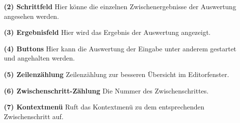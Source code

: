 \documentclass[parskip=full,11pt,twoside]{scrartcl}
\begin{document}
\textbf{(2) Schrittfeld}
\newline Hier könne die einzelnen Zwischenergebnisse der Auswertung angesehen werden.

\textbf{(3) Ergebnisfeld}
\newline Hier wird das Ergebnis der Auswertung angezeigt.

\textbf{(4) Buttons}
\newline Hier kann die Auswertung der Eingabe unter anderem gestartet und angehalten werden.

\textbf{(5) Zeilenzählung}
\newline Zeilenzählung zur besseren Übersicht im Editorfenster.

\textbf{(6) Zwischenschritt-Zählung}
\newline Die Nummer des Zwischenschrittes.

\textbf{(7) Kontextmenü}
\newline Ruft das Kontextmenü zu dem entsprechenden Zwischenschritt auf.


\newpage
{}

\newpage
{}
\end{document}
